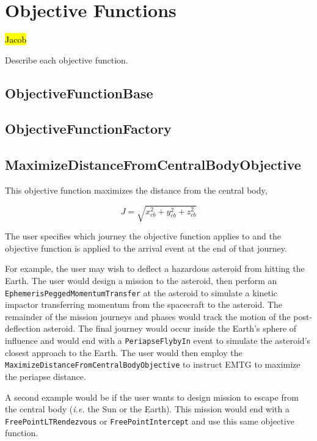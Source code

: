 \chapter{Objective Functions}
\label{chap:objective-functions}

\hl{Jacob}

Describe each objective function.

\section{ObjectiveFunctionBase}
\label{sec:objectivefunctionbase}

\section{ObjectiveFunctionFactory}
\label{sec:objectivefunctionfactory}

\section{MaximizeDistanceFromCentralBodyObjective}
\label{sec:maximizedistancefromcentralbodyobjective}

This objective function maximizes the distance from the central body,

\begin{equation}
	J = \sqrt{x_{cb}^2 + y_{cb}^2 + z_{cb}^2}
	\label{eq:maximizedistancefromcentralbodyobjective}
\end{equation}

The user specifies which journey the objective function applies to and the objective function is applied to the arrival event at the end of that journey.

For example, the user may wish to deflect a hazardous asteroid from hitting the Earth. The user would design a mission to the asteroid, then perform an \texttt{EphemerisPeggedMomentumTransfer} at the asteroid to simulate a kinetic impactor transferring momentum from the spacecraft to the asteroid. The remainder of the mission journeys and phases would track the motion of the post-deflection asteroid. The final journey would occur inside the Earth's sphere of influence and would end with a \texttt{PeriapseFlybyIn} event to simulate the asteroid's closest approach to the Earth. The user would then employ the \texttt{MaximizeDistanceFromCentralBodyObjective} to instruct EMTG to maximize the periapse distance.

A second example would be if the user wants to design mission to escape from the central body (\textit{i.e.} the Sun or the Earth). This mission would end with a \texttt{FreePointLTRendezvous} or \texttt{FreePointIntercept} and use this same objective function.